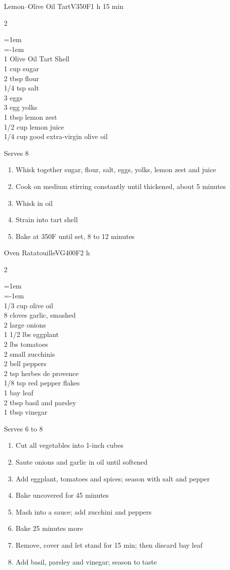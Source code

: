 \documentclass{article}
\newenvironment{recipe}[3][]
    {\begin{cardbase}[#1]{#2}{#3}
    \columnratio{0.333}
    \begin{paracol}{2}}
    {\end{paracol}\end{cardbase}}
\newenvironment{denserecipe}[3][]
    {\small
    \begin{recipe}[#1]{#2}{#3}}
    {\end{recipe}}
\newcommand{\nextcolumn}{\switchcolumn}
\newenvironment{ingredients}
    {
    \begin{obeylines}
    \vspace{\parskip}
    \setlength{\parskip}{0.25em}
    \vspace{-0.25em}
    \leftskip=1em
    \parindent=-1em}
    {\end{obeylines}}
\newenvironment{steps}
    {\begin{enumerate}[leftmargin=*,topsep=0pt]}
    {\end{enumerate}}
\newcommand{\fahrenheit}[1]{#1\textdegree{}F}
\newcommand{\tag}[1]{\hspace{1em}#1}
\newcommand{\symboltag}[2]{\tag{#1\hspace{0.4em}#2}}
\newcommand{\totaltime}[1]{\symboltag{\raisebox{-0.1em}{\small\StopWatchEnd}}{#1}}
\newcommand{\preheat}[1]{\symboltag{\Topbottomheat}{#1}}
\begin{document}
\begin{recipe}{Lemon–Olive Oil Tart}{\tag{V}\preheat{\fahrenheit{350}}\totaltime{1 h 15 min}}
\begin{ingredients}
1 Olive Oil Tart Shell
1 cup sugar
2 tbsp flour
1/4 tsp salt
3 eggs
3 egg yolks
1 tbsp lemon zest
1/2 cup lemon juice
1/4 cup good extra-virgin olive oil
\end{ingredients}
\nextcolumn
Serves 8
\begin{steps}
    \item Whisk together sugar, flour, salt, eggs, yolks, lemon zest and juice
    \item Cook on medium stirring constantly until thickened, about 5 minutes
    \item Whisk in oil
    \item Strain into tart shell
    \item Bake at \fahrenheit{350} until set, 8 to 12 minutes
\end{steps}
\end{recipe}

\begin{denserecipe}{Oven Ratatouille}{\tag{VG}\preheat{\fahrenheit{400}}\totaltime{2 h}}
\begin{ingredients}
1/3 cup olive oil
8 cloves garlic, smashed
2 large onions
1 1/2 lbs eggplant
2 lbs tomatoes
2 small zucchinis
2 bell peppers
2 tsp herbes de provence
1/8 tsp red pepper flakes
1 bay leaf
2 tbsp basil and parsley
1 tbsp vinegar
\end{ingredients}
\nextcolumn
Serves 6 to 8
\begin{steps}
    \item Cut all vegetables into 1-inch cubes
    \item Saute onions and garlic in oil until softened
    \item Add eggplant, tomatoes and spices; season with salt and pepper
    \item Bake uncovered for 45 minutes
    \item Mash into a sauce; add zucchini and peppers
    \item Bake 25 minutes more
    \item Remove, cover and let stand for 15 min; then discard bay leaf
    \item Add basil, parsley and vinegar; season to taste
\end{steps}
\end{denserecipe}
\end{document}
